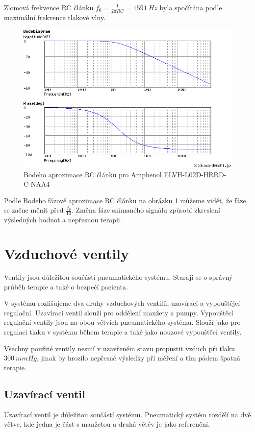 \raggedbottom
Zlomová frekvence RC článku $f_0 = \frac{1}{2 \pi RC} = 1591 \ Hz $ byla spočítána podle maximální frekvence tlakové vlny.

\begin{figure}[H]
    \centering
    \includegraphics[width=0.9\linewidth]{pictures/rc_1k_100n_1591.png}
    \caption{Bodeho aproximace RC článku pro Amphenol ELVH-L02D-HRRD-C-NAA4}
    \label{fig:amphenol_filter}
\end{figure}

Podle Bodeho fázové aproximace RC článku na obrázku \ref{fig:amphenol_filter} můžeme vidět, že fáze se začne měnit před $\frac{f_0}{10}$.
Změna fáze snímaného signálu způsobí zkreslení výsledných hodnot a nepřesnou terapii.
\section{Vzduchové ventily}
Ventily jsou důležitou součástí pneumatického systému. Starají se o správný průběh terapie a také o bezpečí pacienta. \par
V systému rozlišujeme dva druhy vzduchových ventilů, uzavírací a vypouštějcí regulační. Uzavíraci ventil slouží pro oddělení manžety a pumpy. Vypouštěcí regulační ventily jsou na obou větvích pneumatického systému. Slouží jako pro regulaci tlaku v systému během terapie a také jako nouzové vypouštěcí ventily. \par
Všechny použité ventily nesmí v uzavřeném stavu propustit vzduch při tlaku $300 \ mmHg$, jinak by hrozilo nepřesné výsledky při měření a tím pádem špatná terapie.

\subsection{Uzavírací ventil}
Uzavírací ventil je důležitou součástí systému. Pneumatický systém rozdělí na dvě větve, kde jedna je část s manžetou a druhá větěv je jako referenční. \par

